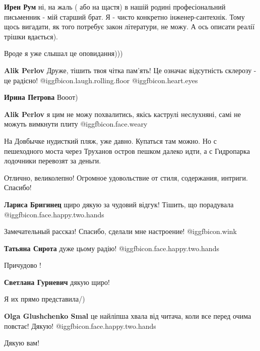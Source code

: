 \begin{itemize}
\begin{itemize} %
\textbf{Ирен Рум} ні, на жаль ( або на щастя) в нашій родині професіональний письменник - мій старший брат. Я - чисто конкретно інженер-сантехнік. Тому щось вигадати, як того потребує закон літератури, не можу. А ось описати реалії трішки вдається).
\end{itemize} %

Вроде я уже слышал це оповидання)))

\begin{itemize} %
\textbf{Alik Perlov} Друже, тішить твоя чітка пам'ять! Це означає відсутність склерозу - це радісно!  @igg{fbicon.laugh.rolling.floor}  @igg{fbicon.heart.eyes} 

\textbf{Ирина Петрова} Вооот)

\textbf{Alik Perlov} я цим не можу похвалитись, якісь каструлі неслухняні, самі не можуть вимкнути плиту @igg{fbicon.face.weary} 
\end{itemize} %


На Довбычке нудисткий пляж, уже давно. Купаться там можно. Но с пешеходного
моста через Труханов остров пешком далеко идти, а с Гидропарка лодочники
перевозят за деньги.

Отлично, великолепно! Огромное удовольствие от стиля, содержания, интриги. Спасибо!

\textbf{Лариса Бригинец} щиро дякую за чудовий відгук! Тішить, що порадувала @igg{fbicon.face.happy.two.hands} 

Замечательный рассказ!
Спасибо, сделали мне настроение! @igg{fbicon.wink} 

\textbf{Татьяна Сирота} дуже цьому радію! @igg{fbicon.face.happy.two.hands} 

Причудово !

\textbf{Светлана Гурневич} дякую щиро!

Я их прямо представила/)

\begin{itemize} %
\textbf{Olga Glushchenko Smal} це найліпша хвала від читача, коли все перед очима повстає! Дякую! @igg{fbicon.face.happy.two.hands} 

Дякую вам!
\end{itemize} %


\end{itemize}

